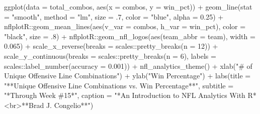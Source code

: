 \documentclass[
  letterpaper,
]{krantz}
\newenvironment{Shaded}{\begin{snugshade}}{\end{snugshade}}
\newcommand{\AttributeTok}[1]{\textcolor[rgb]{0.40,0.45,0.13}{#1}}
\newcommand{\DecValTok}[1]{\textcolor[rgb]{0.68,0.00,0.00}{#1}}
\newcommand{\FloatTok}[1]{\textcolor[rgb]{0.68,0.00,0.00}{#1}}
\newcommand{\FunctionTok}[1]{\textcolor[rgb]{0.28,0.35,0.67}{#1}}
\newcommand{\NormalTok}[1]{\textcolor[rgb]{0.00,0.23,0.31}{#1}}
\newcommand{\SpecialCharTok}[1]{\textcolor[rgb]{0.37,0.37,0.37}{#1}}
\newcommand{\StringTok}[1]{\textcolor[rgb]{0.13,0.47,0.30}{#1}}
\begin{document}
\begin{Shaded}
\begin{Highlighting}[]
\FunctionTok{ggplot}\NormalTok{(}\AttributeTok{data =}\NormalTok{ total\_combos, }\FunctionTok{aes}\NormalTok{(}\AttributeTok{x =}\NormalTok{ combos, }\AttributeTok{y =}\NormalTok{ win\_pct)) }\SpecialCharTok{+}
  \FunctionTok{geom\_line}\NormalTok{(}\AttributeTok{stat =} \StringTok{"smooth"}\NormalTok{, }\AttributeTok{method =} \StringTok{"lm"}\NormalTok{,}
            \AttributeTok{size =}\NormalTok{ .}\DecValTok{7}\NormalTok{, }\AttributeTok{color =} \StringTok{"blue"}\NormalTok{,}
            \AttributeTok{alpha =} \FloatTok{0.25}\NormalTok{) }\SpecialCharTok{+}
\NormalTok{  nflplotR}\SpecialCharTok{::}\FunctionTok{geom\_mean\_lines}\NormalTok{(}\FunctionTok{aes}\NormalTok{(}\AttributeTok{v\_var =}\NormalTok{ combos, }\AttributeTok{h\_var =}\NormalTok{ win\_pct),}
                            \AttributeTok{color =} \StringTok{"black"}\NormalTok{, }\AttributeTok{size =}\NormalTok{ .}\DecValTok{8}\NormalTok{) }\SpecialCharTok{+}
\NormalTok{  nflplotR}\SpecialCharTok{::}\FunctionTok{geom\_nfl\_logos}\NormalTok{(}\FunctionTok{aes}\NormalTok{(}\AttributeTok{team\_abbr =}\NormalTok{ team), }\AttributeTok{width =} \FloatTok{0.065}\NormalTok{) }\SpecialCharTok{+}
  \FunctionTok{scale\_x\_reverse}\NormalTok{(}\AttributeTok{breaks =}\NormalTok{ scales}\SpecialCharTok{::}\FunctionTok{pretty\_breaks}\NormalTok{(}\AttributeTok{n =} \DecValTok{12}\NormalTok{)) }\SpecialCharTok{+}
  \FunctionTok{scale\_y\_continuous}\NormalTok{(}\AttributeTok{breaks =}\NormalTok{ scales}\SpecialCharTok{::}\FunctionTok{pretty\_breaks}\NormalTok{(}\AttributeTok{n =} \DecValTok{6}\NormalTok{),}
                     \AttributeTok{labels =}\NormalTok{ scales}\SpecialCharTok{::}\FunctionTok{label\_number}\NormalTok{(}\AttributeTok{accuracy =} \FloatTok{0.001}\NormalTok{)) }\SpecialCharTok{+}
  \FunctionTok{nfl\_analytics\_theme}\NormalTok{() }\SpecialCharTok{+}
  \FunctionTok{xlab}\NormalTok{(}\StringTok{"\# of Unique Offensive Line Combinations"}\NormalTok{) }\SpecialCharTok{+}
  \FunctionTok{ylab}\NormalTok{(}\StringTok{"Win Percentage"}\NormalTok{) }\SpecialCharTok{+}
  \FunctionTok{labs}\NormalTok{(}\AttributeTok{title =} \StringTok{"**Unique Offensive Line Combinations vs. Win Percentage**"}\NormalTok{,}
       \AttributeTok{subtitle =} \StringTok{"*Through Week \#15*"}\NormalTok{,}
       \AttributeTok{caption =} \StringTok{"*An Introduction to NFL Analytics With R*\textless{}br\textgreater{}**Brad J. Congelio**"}\NormalTok{)}
\end{Highlighting}
\end{Shaded}
\end{document}
